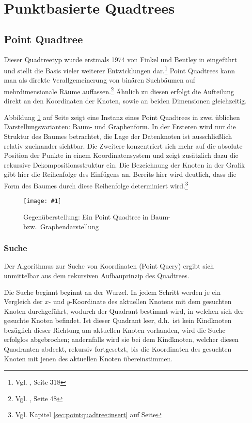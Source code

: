 \documentclass[%
			fontsize=12pt,%
			paper=a4,%
			DIV11,
			liststotoc,
			bibtotoc,
			draft=false,%
			titlepage
			]{scrartcl}
\newcommand{\zit}[3]{#1 \cite{#2}, #3}
\newcommand{\footzit}[3]{\footnote{\zit{#1}{#2}{#3}}}
\newcommand{\myfig}[5] {
 \begin{figure}[tbph]
	 \centering
	 \texttt{[image: \#1]}
	 \caption[#4]{#5}
	 \label{fig:#2}
 \end{figure}
}
\begin{document}
\section{Punktbasierte Quadtrees}
\label{sec:pointbased}
\subsection{Point Quadtree}
Dieser Quadtreetyp wurde erstmals 1974 von Finkel und Bentley in \cite{DBLP:journals/acta/FinkelB74} eingeführt und stellt die Basis vieler weiterer Entwicklungen dar.\footzit{Vgl.}{compgeom:2000}{Seite 318}
Point Quadtrees kann man als direkte Verallgemeinerung von binären Suchbäumen auf mehrdimensionale Räume auffassen.\footzit{Vgl.}{Samet90}{Seite 48}
Ähnlich zu diesen erfolgt die Aufteilung direkt an den Koordinaten der Knoten, sowie an beiden Dimensionen gleichzeitig. 


Abbildung \ref{fig:pointquadtree} auf Seite \pageref{fig:pointquadtree} zeigt eine Instanz eines Point Quadtrees in zwei üblichen Darstellungsvarianten: Baum- und Graphenform.
In der Ersteren wird nur die Struktur des Baumes betrachtet, die Lage der Datenknoten ist ausschließlich relativ zueinander sichtbar.
Die Zweitere konzentriert sich mehr auf die absolute Position der Punkte in einem Koordinatensystem und zeigt zusätzlich dazu die rekursive Dekompositionsstruktur ein.
Die Bezeichnung der Knoten in der Grafik gibt hier die Reihenfolge des Einfügens an. Bereits hier wird deutlich, dass die Form des Baumes durch diese Reihenfolge determiniert wird.\footnote{Vgl. Kapitel \ref{sec:pointquadtree:insert} auf Seite \pageref{sec:pointquadtree:insert}}
\myfig{img/pointquadtree-ins7+tree-trimmed}{pointquadtree}{width=.9\textwidth}{Point Quadtree}{Gegenüberstellung: Ein Point Quadtree in Baum- bzw.\ Graphendarstellung}

\subsubsection{Suche}
\label{sec:pointquadtree-suche}
Der Algorithmus zur Suche von Koordinaten (Point Query) ergibt sich unmittelbar aus dem rekursiven Aufbauprinzip des Quadtrees. 

Die Suche beginnt beginnt an der Wurzel. In jedem Schritt werden je ein Vergleich der $x$- und $y$-Koordinate des aktuellen Knotens mit dem gesuchten Knoten durchgeführt, wodurch der Quadrant bestimmt wird, in welchen sich der gesuchte Knoten befindet. Ist dieser Quadrant leer, d.h.\ ist kein Kindknoten bezüglich dieser Richtung am aktuellen Knoten vorhanden, wird die Suche erfolglos abgebrochen; andernfalls wird sie bei dem Kindknoten, welcher diesen Quadranten abdeckt, rekursiv fortgesetzt, bis die Koordinaten des gesuchten Knoten mit jenen des aktuellen Knoten übereinstimmen.
\end{document}
